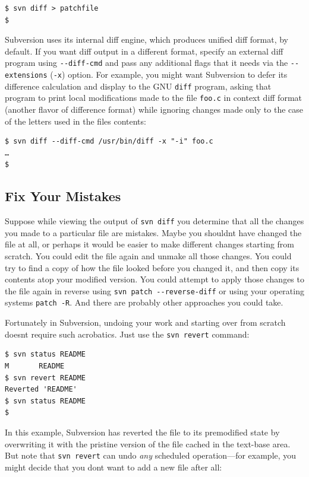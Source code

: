 \begin{verbatim}
$ svn diff > patchfile
$
\end{verbatim}

Subversion uses its internal diff engine, which produces unified diff
format, by default. If you want diff output in a different format,
specify an external diff program using \texttt{-\/-diff-cmd} and pass
any additional flags that it needs via the \texttt{-\/-extensions}
(\texttt{-x}) option. For example, you might want Subversion to defer
its difference calculation and display to the GNU \texttt{diff} program,
asking that program to print local modifications made to the file
\texttt{foo.c} in context diff format (another flavor of difference
format) while ignoring changes made only to the case of the letters used
in the file\textquotesingle s contents:

\begin{verbatim}
$ svn diff --diff-cmd /usr/bin/diff -x "-i" foo.c
…
$
\end{verbatim}

\subsection{Fix Your Mistakes}\label{svn.tour.cycle.revert}

Suppose while viewing the output of \texttt{svn\ diff} you determine
that all the changes you made to a particular file are mistakes. Maybe
you shouldn\textquotesingle t have changed the file at all, or perhaps
it would be easier to make different changes starting from scratch. You
could edit the file again and unmake all those changes. You could try to
find a copy of how the file looked before you changed it, and then copy
its contents atop your modified version. You could attempt to apply
those changes to the file again in reverse using
\texttt{svn\ patch\ -\/-reverse-diff} or using your operating
system\textquotesingle s \texttt{patch\ -R}. And there are probably
other approaches you could take.

Fortunately in Subversion, undoing your work and starting over from
scratch doesn\textquotesingle t require such acrobatics. Just use the
\texttt{svn\ revert} command:

\begin{verbatim}
$ svn status README
M       README
$ svn revert README
Reverted 'README'
$ svn status README
$
\end{verbatim}

In this example, Subversion has reverted the file to its premodified
state by overwriting it with the pristine version of the file cached in
the text-base area. But note that \texttt{svn\ revert} can undo
\emph{any} scheduled operation---for example, you might decide that you
don\textquotesingle t want to add a new file after all:

